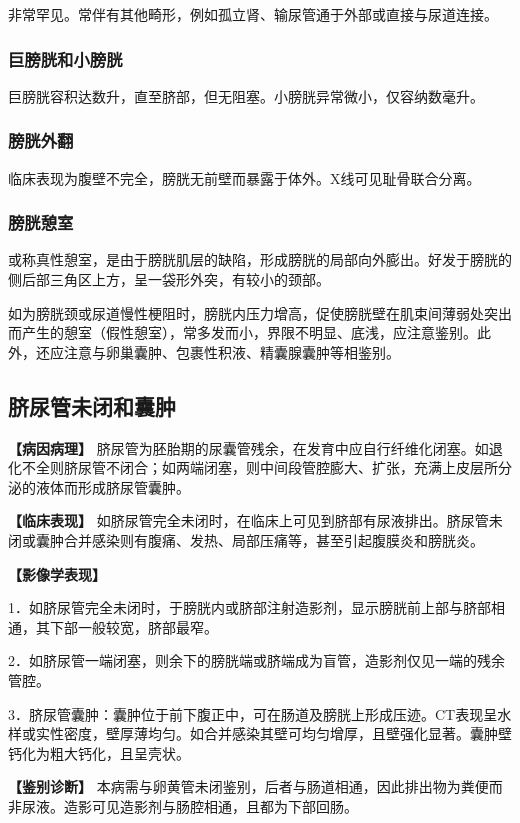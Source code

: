 非常罕见。常伴有其他畸形，例如孤立肾、输尿管通于外部或直接与尿道连接。

\subsubsection{巨膀胱和小膀胱}

巨膀胱容积达数升，直至脐部，但无阻塞。小膀胱异常微小，仅容纳数毫升。

\subsubsection{膀胱外翻}

临床表现为腹壁不完全，膀胱无前壁而暴露于体外。X线可见耻骨联合分离。

\subsubsection{膀胱憩室}

或称真性憩室，是由于膀胱肌层的缺陷，形成膀胱的局部向外膨出。好发于膀胱的侧后部三角区上方，呈一袋形外突，有较小的颈部。

如为膀胱颈或尿道慢性梗阻时，膀胱内压力增高，促使膀胱壁在肌束间薄弱处突出而产生的憩室（假性憩室），常多发而小，界限不明显、底浅，应注意鉴别。此外，还应注意与卵巢囊肿、包裹性积液、精囊腺囊肿等相鉴别。

\subsection{脐尿管未闭和囊肿}

\textbf{【病因病理】}
脐尿管为胚胎期的尿囊管残余，在发育中应自行纤维化闭塞。如退化不全则脐尿管不闭合；如两端闭塞，则中间段管腔膨大、扩张，充满上皮层所分泌的液体而形成脐尿管囊肿。

\textbf{【临床表现】}
如脐尿管完全未闭时，在临床上可见到脐部有尿液排出。脐尿管未闭或囊肿合并感染则有腹痛、发热、局部压痛等，甚至引起腹膜炎和膀胱炎。

\textbf{【影像学表现】}

1．如脐尿管完全未闭时，于膀胱内或脐部注射造影剂，显示膀胱前上部与脐部相通，其下部一般较宽，脐部最窄。

2．如脐尿管一端闭塞，则余下的膀胱端或脐端成为盲管，造影剂仅见一端的残余管腔。

3．脐尿管囊肿：囊肿位于前下腹正中，可在肠道及膀胱上形成压迹。CT表现呈水样或实性密度，壁厚薄均匀。如合并感染其壁可均匀增厚，且壁强化显著。囊肿壁钙化为粗大钙化，且呈壳状。

\textbf{【鉴别诊断】}
本病需与卵黄管未闭鉴别，后者与肠道相通，因此排出物为粪便而非尿液。造影可见造影剂与肠腔相通，且都为下部回肠。

